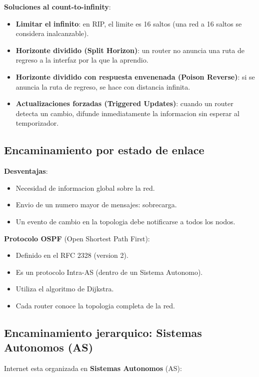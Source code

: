 \textbf{Soluciones al count-to-infinity}:
\begin{itemize}
    \item \textbf{Limitar el infinito}: en RIP, el limite es 16 saltos (una red a 16
    saltos se considera inalcanzable).
    \item \textbf{Horizonte dividido (Split Horizon)}: un router no anuncia una ruta
    de regreso a la interfaz por la que la aprendio.
    \item \textbf{Horizonte dividido con respuesta envenenada (Poison Reverse)}: si
    se anuncia la ruta de regreso, se hace con distancia infinita.
    \item \textbf{Actualizaciones forzadas (Triggered Updates)}: cuando un router detecta
    un cambio, difunde inmediatamente la informacion sin esperar al temporizador.
\end{itemize}

\subsection{Encaminamiento por estado de enlace}

\textbf{Desventajas}:
\begin{itemize}
    \item Necesidad de informacion global sobre la red.
    \item Envio de un numero mayor de mensajes: sobrecarga.
    \item Un evento de cambio en la topologia debe notificarse a todos los nodos.
\end{itemize}

\textbf{Protocolo OSPF} (Open Shortest Path First):
\begin{itemize}
    \item Definido en el RFC 2328 (version 2).
    \item Es un protocolo Intra-AS (dentro de un Sistema Autonomo).
    \item Utiliza el algoritmo de Dijkstra.
    \item Cada router conoce la topologia completa de la red.
\end{itemize}

\subsection{Encaminamiento jerarquico: Sistemas Autonomos (AS)}

Internet esta organizada en \textbf{Sistemas Autonomos} (AS):

